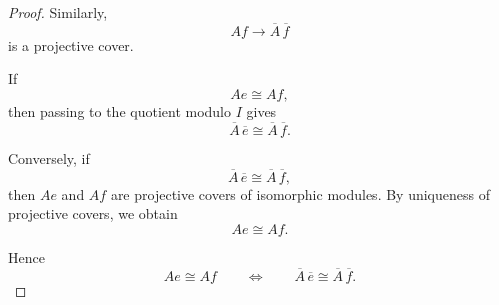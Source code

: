 \begin{proof}
    Similarly,
    \[
        Af\longrightarrow \overline{A}\,\overline{f}
    \]
    is a projective cover.

    If
    \[
        Ae\cong Af,
    \]
    then passing to the quotient modulo \(I\) gives
    \[
        \overline{A}\,\overline{e}
        \cong
        \overline{A}\,\overline{f}.
    \]

    Conversely, if
    \[
        \overline{A}\,\overline{e}
        \cong
        \overline{A}\,\overline{f},
    \]
    then \(Ae\) and \(Af\) are projective covers of isomorphic modules. By uniqueness
    of projective covers, we obtain
    \[
        Ae\cong Af.
    \]

    Hence
    \[
        Ae\cong Af
        \qquad\Longleftrightarrow\qquad
        \overline{A}\,\overline{e}\cong \overline{A}\,\overline{f}.
    \]
\end{proof}
